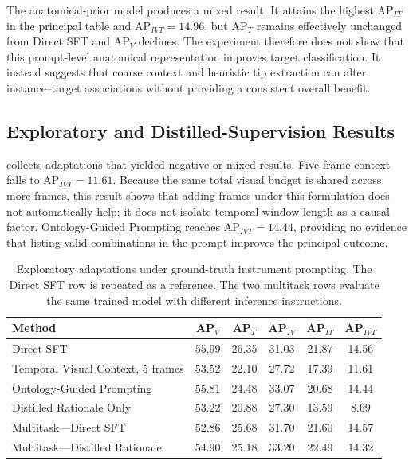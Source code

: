 The anatomical-prior model produces a mixed result. It attains the highest AP$_{IT}$ in the principal table and AP$_{IVT}=14.96$, but AP$_T$ remains effectively unchanged from Direct SFT and AP$_V$ declines. The experiment therefore does not show that this prompt-level anatomical representation improves target classification. It instead suggests that coarse context and heuristic tip extraction can alter instance--target associations without providing a consistent overall benefit.

\subsection{Exploratory and Distilled-Supervision Results}

 collects adaptations that yielded negative or mixed results. Five-frame context falls to AP$_{IVT}=11.61$. Because the same total visual budget is shared across more frames, this result shows that adding frames under this formulation does not automatically help; it does not isolate temporal-window length as a causal factor. Ontology-Guided Prompting reaches AP$_{IVT}=14.44$, providing no evidence that listing valid combinations in the prompt improves the principal outcome.

\begin{table}[htb!]
\centering
\caption{Exploratory adaptations under ground-truth instrument prompting. The Direct SFT row is repeated as a reference. The two multitask rows evaluate the same trained model with different inference instructions.}
\label{tab:c5:secondary-adaptations}
\begin{tabular}{lccccc}
\toprule
Method & AP$_V$ & AP$_T$ & AP$_{IV}$ & AP$_{IT}$ & AP$_{IVT}$ \\
\midrule
Direct SFT & 55.99 & 26.35 & 31.03 & 21.87 & 14.56 \\
Temporal Visual Context, 5 frames & 53.52 & 22.10 & 27.72 & 17.39 & 11.61 \\
Ontology-Guided Prompting & 55.81 & 24.48 & 33.07 & 20.68 & 14.44 \\
Distilled Rationale Only & 53.22 & 20.88 & 27.30 & 13.59 & 8.69 \\
Multitask---Direct SFT & 52.86 & 25.68 & 31.70 & 21.60 & 14.57 \\
Multitask---Distilled Rationale & 54.90 & 25.18 & 33.20 & 22.49 & 14.32 \\
\bottomrule
\end{tabular}
\end{table}

